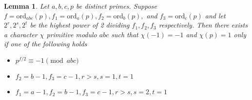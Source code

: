\documentclass{article}
\newcommand{\ord}[0]{\mathrm{ord}}
\newtheorem{lemma}[theorem]{Lemma}
\theoremstyle{definition}
\theoremstyle{definition}
\theoremstyle{remark}
\begin{document}
\begin{lemma} \label{lem:char_prim_powers_of_two} Let $a,b,c,p$ be distinct primes. Suppose $f = \ord_{abc}(p), f_1 = \ord_a(p), f_2 = \ord_b(p),$ and $f_3 = \ord_c(p)$ and let $2^r, 2^s, 2^t$ be the highest power of 2 dividing $f_1, f_2, f_3$ respectively. Then there exists a character $\chi$ primitive modulo $abc$ such that $\chi(-1)=-1$ and $\chi(p)=1$ only if one of the following holds
\begin{itemize}
\item $p^{f/2} \equiv -1 \pmod{abc}$
\item $f_2 = b - 1, f_3 = c - 1, r > s, s = 1, t = 1$
\item $f_1 = a - 1, f_2 = b - 1, f_3 = c - 1, r > s, s = 2, t = 1$
\end{itemize}
\end{lemma}
\end{document}
